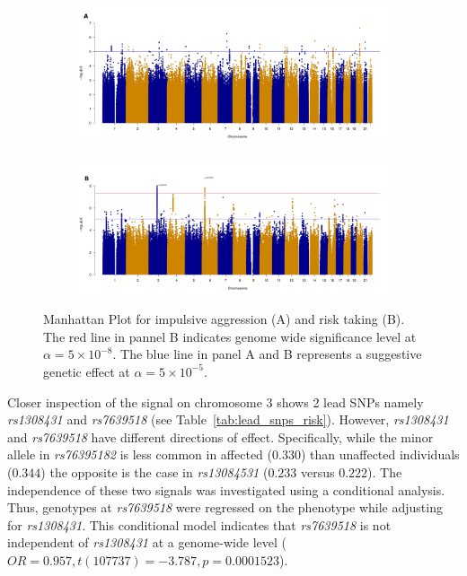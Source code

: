 \begin{figure}[!htpb]
  \begin{subfigure}{1\textwidth}
  \centering
  \includegraphics[width=0.8\linewidth]{ukb_assoc/figure/manhatten_plots/agg_manhatten_color_2_A.jpeg}
  \end{subfigure}
  \begin{subfigure}{1\textwidth}
  \centering
  \includegraphics[width=0.8\linewidth]{ukb_assoc/figure/manhatten_plots/risk_manhatten_color_B.jpeg}
  \end{subfigure}
  \caption[Manhattan Plots]{
    Manhattan Plot for impulsive aggression (A)
    and risk taking (B).
    The red line in pannel B indicates genome wide significance level at $\alpha=5\times10^{-8}$.
    The blue line in panel A and B represents a suggestive genetic effect at $\alpha=5\times10^{-5}$.}\label{fig:manhatten}
\end{figure}

Closer inspection of the signal on chromosome 3 shows 2 lead SNPs namely \textit{rs1308431} and \textit{rs7639518} (see Table~\ref{tab:lead_snps_risk}).
However, \textit{rs1308431} and \textit{rs7639518} have different directions of effect.
Specifically, while the minor allele in \textit{rs76395182} is less common in affected ($0.330$) than unaffected individuals ($0.344$) the opposite is the case in \textit{rs13084531} ($0.233$ versus $0.222$).
The independence of these two signals was investigated using a conditional analysis.
Thus, genotypes at \textit{rs7639518} were regressed on the phenotype while adjusting for \textit{rs1308431}.
This conditional model indicates that \textit{rs7639518} is not independent of \textit{rs1308431} at a genome-wide level ($OR=0.957, t(107737)=-3.787, p=0.0001523$).

